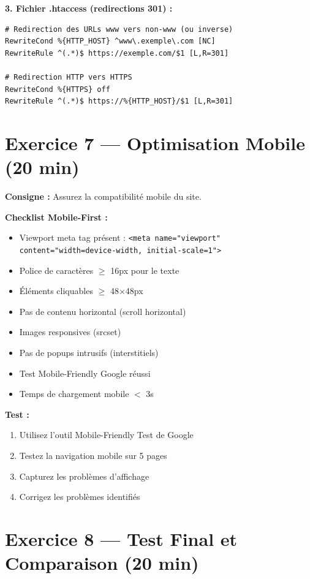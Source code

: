 \documentclass[12pt,a4paper]{report}
\begin{document}
\textbf{3. Fichier .htaccess (redirections 301) :}
\begin{lstlisting}
# Redirection des URLs www vers non-www (ou inverse)
RewriteCond %{HTTP_HOST} ^www\.exemple\.com [NC]
RewriteRule ^(.*)$ https://exemple.com/$1 [L,R=301]

# Redirection HTTP vers HTTPS
RewriteCond %{HTTPS} off
RewriteRule ^(.*)$ https://%{HTTP_HOST}/$1 [L,R=301]
\end{lstlisting}

\section{Exercice 7 --- Optimisation Mobile (20 min)}

\textbf{Consigne :} Assurez la compatibilité mobile du site.

\textbf{Checklist Mobile-First :}
\begin{itemize}
\item[$\square$] Viewport meta tag présent : \texttt{<meta name="viewport" content="width=device-width, initial-scale=1">}
\item[$\square$] Police de caractères $\ge$ 16px pour le texte
\item[$\square$] Éléments cliquables $\ge$ 48$\times$48px
\item[$\square$] Pas de contenu horizontal (scroll horizontal)
\item[$\square$] Images responsives (srcset)
\item[$\square$] Pas de popups intrusifs (interstitiels)
\item[$\square$] Test Mobile-Friendly Google réussi
\item[$\square$] Temps de chargement mobile $<$ 3s
\end{itemize}

\textbf{Test :}
\begin{enumerate}
\item Utilisez l'outil Mobile-Friendly Test de Google
\item Testez la navigation mobile sur 5 pages
\item Capturez les problèmes d'affichage
\item Corrigez les problèmes identifiés
\end{enumerate}

\section{Exercice 8 --- Test Final et Comparaison (20 min)}
\end{document}
